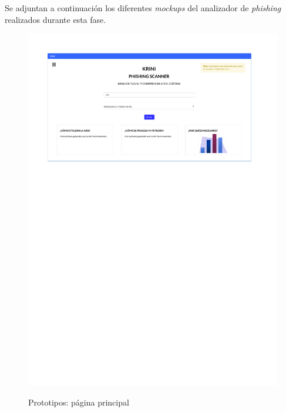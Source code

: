 Se adjuntan a continuación los diferentes \textit{mockups} del analizador de \textit{phishing} realizados durante esta fase.


\begin{figure}[h]
	\caption{Prototipos: página principal}
	\centering
	\includegraphics[width=\textwidth]{../img/anexos/mockups/1-mockups-index}
	\label{mock:index}
\end{figure}

